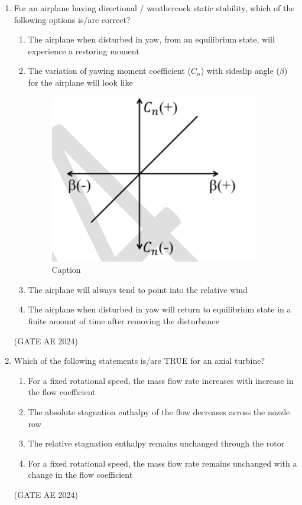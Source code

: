 \documentclass[journal,12pt,onecolumn]{IEEEtran}
\theoremstyle{remark}
\begin{document}
\begin{enumerate}
\item For an airplane having directional / weathercock static stability, which of the following options is/are correct?
\begin{enumerate}
    \item The airplane when disturbed in yaw, from an equilibrium state, will experience a restoring moment
    \item The variation of yawing moment coefficient ($C_n$) with sideslip angle ($\beta$) for the airplane will look like 
    \begin{figure}[H]
        \centering
        \includegraphics[width=0.5\columnwidth]{figs/Screenshot 2025-08-24 062341.png}
        \caption{Caption}
        \label{fig:placeholder}
    \end{figure}
    \item The airplane will always tend to point into the relative wind
    \item The airplane when disturbed in yaw will return to equilibrium state in a finite amount of time after removing the disturbance
\end{enumerate}
\hfill(GATE AE 2024)

\item Which of the following statements is/are TRUE for an axial turbine?
\begin{enumerate}
    \item For a fixed rotational speed, the mass flow rate increases with increase in the flow coefficient
    \item The absolute stagnation enthalpy of the flow decreases across the nozzle row
    \item The relative stagnation enthalpy remains unchanged through the rotor
    \item For a fixed rotational speed, the mass flow rate remains unchanged with a change in the flow coefficient
\end{enumerate}
\hfill(GATE AE 2024)


\end{enumerate}
\end{document}
